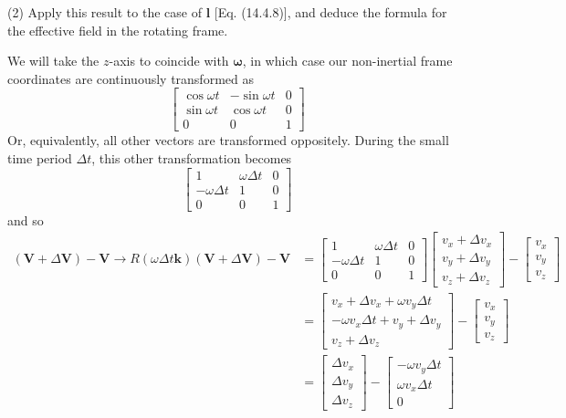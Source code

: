 \documentclass[../principles-of-quantum-mechanics.tex]{subfiles}
\begin{document}
\begin{questions}
		(2) Apply this result to the case of $\mathbf{l}$ [Eq. (14.4.8)], and deduce the formula for the effective field in the rotating frame.
		
		\begin{solution}
			We will take the $z$-axis to coincide with $\boldsymbol{\omega}$, in which case our non-inertial frame coordinates are continuously transformed as
			$$\begin{bmatrix}
				\cos\omega t & {-\sin\omega} t & 0 \\ {\sin\omega t} & \cos\omega t & 0 \\ 0 & 0 & 1
			\end{bmatrix}$$
			Or, equivalently, all other vectors are transformed oppositely. During the small time period $\Delta t$, this other transformation becomes
			$$\begin{bmatrix}
				1 & {\omega\Delta t} & 0 \\ {-\omega\Delta t} & 1 & 0 \\ 0 & 0 & 1
			\end{bmatrix}$$
			and so
			\begin{align*}
				(\mathbf{V} + \Delta\mathbf{V}) - \mathbf{V} \to R(\omega\Delta t\mathbf{k})(\mathbf{V} + \Delta\mathbf{V}) - \mathbf{V} &= \begin{bmatrix}
					1 & {\omega\Delta t} & 0 \\ {-\omega\Delta t} & 1 & 0 \\ 0 & 0 & 1
				\end{bmatrix}\begin{bmatrix}v_x + \Delta v_x \\ v_y + \Delta v_y \\ v_z + \Delta v_z\end{bmatrix} - \begin{bmatrix}v_x \\ v_y \\ v_z\end{bmatrix} \\
				&= \begin{bmatrix}v_x + \Delta v_x + \omega v_y\Delta t \\ {-\omega v_x\Delta t} + v_y + \Delta v_y \\ v_z + \Delta v_z\end{bmatrix} - \begin{bmatrix}v_x \\ v_y \\ v_z\end{bmatrix} \\
				&= \begin{bmatrix}\Delta v_x \\ \Delta v_y \\ \Delta v_z\end{bmatrix} - \begin{bmatrix}-\omega v_y\Delta t \\ \omega v_x\Delta t \\ 0\end{bmatrix} \\

\end{align*}
\end{solution}
\end{questions}
\end{document}
